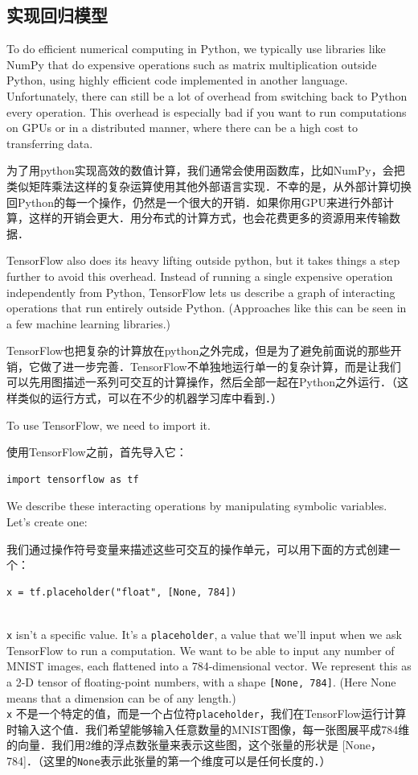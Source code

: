 \subsection {实现回归模型}
To do efficient numerical computing in Python, we typically use libraries like NumPy that do expensive operations such as matrix multiplication outside Python, using highly efficient code implemented in another language. Unfortunately, there can still be a lot of overhead from switching back to Python every operation. This overhead is especially bad if you want to run computations on GPUs or in a distributed manner, where there can be a high cost to transferring data.

为了用python实现高效的数值计算，我们通常会使用函数库，比如NumPy，会把类似矩阵乘法这样的复杂运算使用其他外部语言实现．不幸的是，从外部计算切换回Python的每一个操作，仍然是一个很大的开销．如果你用GPU来进行外部计算，这样的开销会更大．用分布式的计算方式，也会花费更多的资源用来传输数据．

TensorFlow also does its heavy lifting outside python, but it takes things a step further to avoid this overhead. Instead of running a single expensive operation independently from Python, TensorFlow lets us describe a graph of interacting operations that run entirely outside Python. (Approaches like this can be seen in a few machine learning libraries.)

TensorFlow也把复杂的计算放在python之外完成，但是为了避免前面说的那些开销，它做了进一步完善．TensorFlow不单独地运行单一的复杂计算，而是让我们可以先用图描述一系列可交互的计算操作，然后全部一起在Python之外运行．（这样类似的运行方式，可以在不少的机器学习库中看到．）


To use TensorFlow, we need to import it.

使用TensorFlow之前，首先导入它：

\begin{lstlisting}
import tensorflow as tf
\end{lstlisting}

We describe these interacting operations by manipulating symbolic variables. Let's create one:

我们通过操作符号变量来描述这些可交互的操作单元，可以用下面的方式创建一个：

\begin{lstlisting}
x = tf.placeholder("float", [None, 784])
\end{lstlisting}\\
\lstinline{x} isn't a specific value. It's a \lstinline{placeholder}, a value that we'll input when we ask TensorFlow to run a computation. We want to be able to input any number of MNIST images, each flattened into a 784-dimensional vector. We represent this as a 2-D tensor of floating-point numbers, with a shape \lstinline{[None, 784]}. (Here None means that a dimension can be of any length.)\\
\lstinline{x} 不是一个特定的值，而是一个占位符\lstinline{placeholder}，我们在TensorFlow运行计算时输入这个值．我们希望能够输入任意数量的MNIST图像，每一张图展平成784维的向量．我们用2维的浮点数张量来表示这些图，这个张量的形状是 [None，784]．（这里的\lstinline{None}表示此张量的第一个维度可以是任何长度的．）


